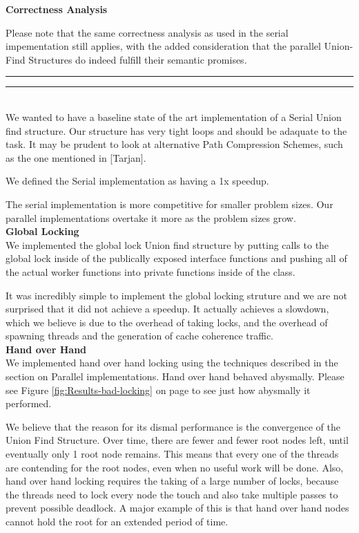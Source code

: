 \documentclass[11pt]{article}
\newcommand{\question}[2] {\vspace{.25in} \hrule\vspace{0.5em}
\noindent{\bf #1: #2} \vspace{0.5em}
\hrule \vspace{.10in}}
\begin{document}
\textbf{Correctness Analysis}

Please note that the same correctness analysis as used in the serial impementation still applies, with the added consideration that the parallel Union-Find Structures do indeed fulfill their semantic promises.

\newpage

\question{Specific Implementations and Result}

\textbf{Serial}\\
We wanted to have a baseline state of the art implementation of a Serial Union find structure. Our structure has very tight loops and should be adaquate to the task. It may be prudent to look at alternative Path Compression Schemes, such as the one mentioned in [Tarjan].

We defined the Serial implementation as having a 1x speedup.

The serial implementation is more competitive for smaller problem sizes. Our parallel implementations overtake it more as the problem sizes grow.\\


\textbf{Global Locking}\\
We implemented the global lock Union find structure by putting calls to the global lock inside of the publically exposed interface functions and pushing all of the actual worker functions into private functions inside of the class.

It was incredibly simple to implement the global locking struture and we are not surprised that it did not achieve a speedup. It actually achieves a slowdown, which we believe is due to the overhead of taking locks, and the overhead of spawning threads and the generation of cache coherence traffic.\\


\textbf{Hand over Hand}\\
We implemented hand over hand locking using the techniques described in the section on Parallel implementations. Hand over hand behaved abysmally. Please see Figure \ref{fig:Results-bad-locking} on page \pageref{fig:Results-bad-locking} to see just how abysmally it performed.

We believe that the reason for its dismal performance is the convergence of the Union Find Structure. Over time, there are fewer and fewer root nodes left, until eventually only 1 root node remains. This means that every one of the threads are contending for the root nodes, even when no useful work will be done. Also, hand over hand locking requires the taking of a large number of locks, because the threads need to lock every node the touch and also take multiple passes to prevent possible deadlock. A major example of this is that hand over hand nodes cannot hold the root for an extended period of time.\\
\end{document}
